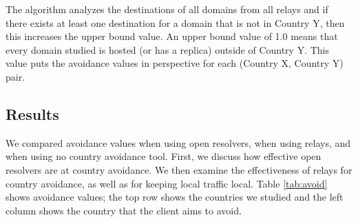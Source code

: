 The algorithm analyzes the destinations of all domains from all relays and if there exists at least one destination for a domain that is not in Country Y, then this increases the upper bound value.  An upper bound value of 1.0 means that every domain studied is hosted (or has a replica) outside of Country Y.  This value puts the avoidance values in perspective for each (Country X, Country Y) pair. 

\subsection{Results}

We compared avoidance values when using open resolvers, when using
relays, and when using no country avoidance tool.  First, we discuss how
effective open resolvers are at country avoidance.  We then examine the
effectiveness of relays for country avoidance, as well as for keeping local
traffic local.  Table \ref{tab:avoid} shows avoidance values; the top
row shows the countries we studied and the left column shows the country
that the client aims to avoid.

